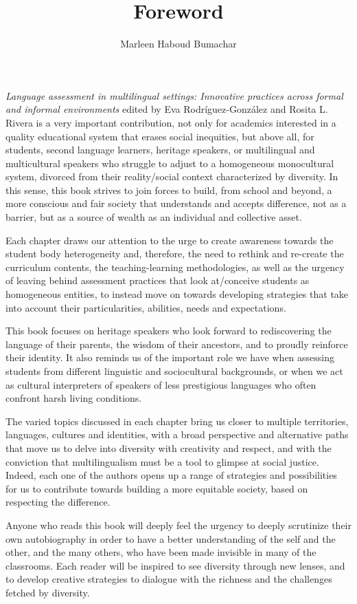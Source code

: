 \documentclass[output=paper]{langscibook}
\author{Marleen {Haboud Bumachar}\affiliation{Pontificia Universidad Católica del Ecuador; Ruhr-Universität Bochum}}
\title{Foreword}
\begin{document}
\maketitle

\noindent\textit{Language assessment in multilingual settings: Innovative practices across formal and informal environments} edited by Eva Rodríguez-González and Rosita L. Rivera is a very important contribution, not only for academics interested in a quality educational system that erases social inequities, but above all, for students, second language learners, heritage speakers, or multilingual and multicultural speakers who struggle to adjust to a homogeneous monocultural system, divorced from their reality\slash social context characterized by diversity. In this sense, this book strives to join forces to build, from school and beyond, a more conscious and fair society that understands and accepts difference, not as a barrier, but as a source of wealth as an individual and collective asset.

Each chapter draws our attention to the urge to create awareness towards the student body heterogeneity and, therefore, the need to rethink and re-create the curriculum contents, the teaching-learning methodologies, as well as the urgency of leaving behind assessment practices that look at\slash conceive students as homogeneous entities, to instead move on towards developing strategies that take into account their particularities, abilities, needs and expectations. 

This book focuses on heritage speakers who look forward to rediscovering the language of their parents, the wisdom of their ancestors, and to proudly reinforce their identity. It also reminds us of the important role we have when assessing students from different linguistic and sociocultural backgrounds, or when we act as cultural interpreters of speakers of less prestigious languages who often confront harsh living conditions.

The varied topics discussed in each chapter bring us closer to multiple territories, languages, cultures and identities, with a broad perspective and alternative paths that move us to delve into diversity with creativity and respect, and with the conviction that multilingualism must be a tool to glimpse at social justice. Indeed, each one of the authors opens up a range of strategies and possibilities for us to contribute towards building a more equitable society, based on respecting the difference. 

Anyone who reads this book will deeply feel the urgency to deeply scrutinize their own autobiography in order to have a better understanding of the self and the other, and the many others, who have been made invisible in many of the classrooms. Each reader will be inspired to see diversity through new lenses, and to develop creative strategies to dialogue with the richness and the challenges fetched by diversity.
\end{document}
